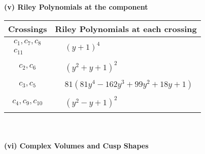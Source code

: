 \documentclass[1p]{elsarticle_modified}
\theoremstyle{definition}
\begin{document}
\newpage\renewcommand{\arraystretch}{1}
\flushleft \textbf{(v) Riley Polynomials at the component}\newline \\
\begin{tabular}{m{50pt}|m{274pt}}
Crossings & \hspace{64pt}Riley Polynomials at each crossing \\
\hline $$\begin{aligned}c_{1},c_{7},c_{8}\\c_{11}\end{aligned}$$&$\begin{aligned}
&(y+1)^4
\end{aligned}$\\
\hline $$\begin{aligned}c_{2},c_{6}\end{aligned}$$&$\begin{aligned}
&(y^2+y+1)^2
\end{aligned}$\\
\hline $$\begin{aligned}c_{3},c_{5}\end{aligned}$$&$\begin{aligned}
&81(81 y^4-162 y^3+99 y^2+18 y+1)
\end{aligned}$\\
\hline $$\begin{aligned}c_{4},c_{9},c_{10}\end{aligned}$$&$\begin{aligned}
&(y^2- y+1)^2
\end{aligned}$\\
\hline
\end{tabular}\\~\\
\newpage\flushleft \textbf{(vi) Complex Volumes and Cusp Shapes}
\end{document}
